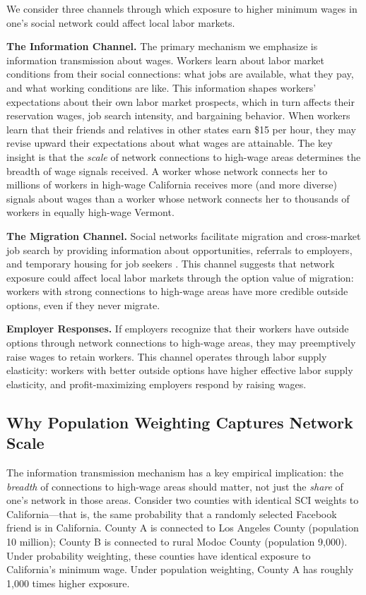 \documentclass[12pt]{article}
\begin{document}
We consider three channels through which exposure to higher minimum wages in one's social network could affect local labor markets.

\textbf{The Information Channel.} The primary mechanism we emphasize is information transmission about wages. Workers learn about labor market conditions from their social connections: what jobs are available, what they pay, and what working conditions are like. This information shapes workers' expectations about their own labor market prospects, which in turn affects their reservation wages, job search intensity, and bargaining behavior. When workers learn that their friends and relatives in other states earn \$15 per hour, they may revise upward their expectations about what wages are attainable. The key insight is that the \textit{scale} of network connections to high-wage areas determines the breadth of wage signals received. A worker whose network connects her to millions of workers in high-wage California receives more (and more diverse) signals about wages than a worker whose network connects her to thousands of workers in equally high-wage Vermont.

\textbf{The Migration Channel.} Social networks facilitate migration and cross-market job search by providing information about opportunities, referrals to employers, and temporary housing for job seekers \citep{munshi2003networks}. This channel suggests that network exposure could affect local labor markets through the option value of migration: workers with strong connections to high-wage areas have more credible outside options, even if they never migrate.

\textbf{Employer Responses.} If employers recognize that their workers have outside options through network connections to high-wage areas, they may preemptively raise wages to retain workers. This channel operates through labor supply elasticity: workers with better outside options have higher effective labor supply elasticity, and profit-maximizing employers respond by raising wages.

\subsection{Why Population Weighting Captures Network Scale}

The information transmission mechanism has a key empirical implication: the \textit{breadth} of connections to high-wage areas should matter, not just the \textit{share} of one's network in those areas. Consider two counties with identical SCI weights to California---that is, the same probability that a randomly selected Facebook friend is in California. County A is connected to Los Angeles County (population 10 million); County B is connected to rural Modoc County (population 9,000). Under probability weighting, these counties have identical exposure to California's minimum wage. Under population weighting, County A has roughly 1,000 times higher exposure.
\end{document}
